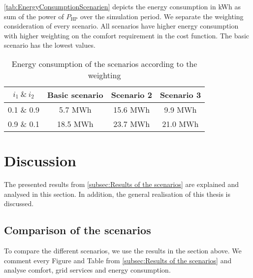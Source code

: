 \autoref{tab:EnergyConsumptionScenarien} depicts the energy consumption in kWh as sum of the power of $P_\text{HP}$ over the simulation period. We separate the weighting consideration of every scenario. All scenarios have higher energy consumption with higher weighting on the comfort requirement in the cost function. The basic scenario has the lowest values. 
    \begin{table}[H]
        \centering
        \begin{tabular}{c||c|c|c}
          $i_\text{1} \ \& \  i_\text{2}$  &  Basic scenario & Scenario 2 & Scenario 3\\
          \hline  \hline
             0.1 \& 0.9 & 5.7 MWh & 15.6 MWh & 9.9 MWh\\
             0.9 \& 0.1 & 18.5 MWh & 23.7 MWh & 21.0 MWh\\
        \end{tabular}
        \caption{Energy consumption of the scenarios according to the weighting}
        \label{tab:EnergyConsumptionScenarien}
    \end{table}

\section{Discussion}
\label{sec:discussion}
The presented results from \autoref{subsec:Results of the scenarios} are explained and analysed in this section. In addition, the general realisation of this thesis is discussed.

\subsection{Comparison of the scenarios}
\label{subsec:Comparison fo the scenarios}
To compare the different scenarios, we use the results in the section above. We comment every Figure and Table from \autoref{subsec:Results of the scenarios} and analyse comfort, grid services and energy consumption.\newline

